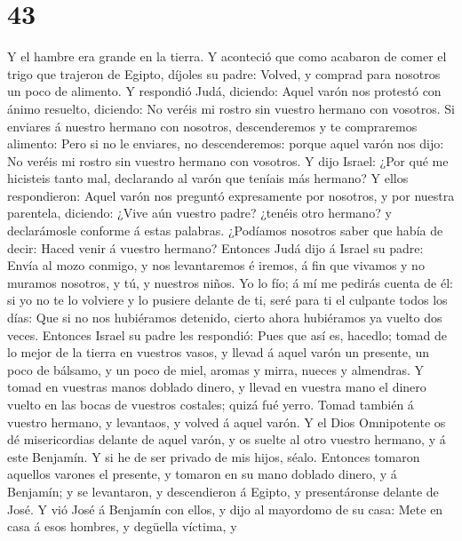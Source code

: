 \hypertarget{section-42}{%
\section{43}\label{section-42}}

 Y el hambre era grande en la tierra.  Y
aconteció que como acabaron de comer el trigo que trajeron de Egipto,
díjoles su padre: Volved, y comprad para nosotros un poco de alimento.
 Y respondió Judá, diciendo: Aquel varón nos protestó con
ánimo resuelto, diciendo: No veréis mi rostro sin vuestro hermano con
vosotros.  Si enviares á nuestro hermano con nosotros,
descenderemos y te compraremos alimento:  Pero si no le
enviares, no descenderemos: porque aquel varón nos dijo: No veréis mi
rostro sin vuestro hermano con vosotros.  Y dijo Israel:
¿Por qué me hicisteis tanto mal, declarando al varón que teníais más
hermano?  Y ellos respondieron: Aquel varón nos preguntó
expresamente por nosotros, y por nuestra parentela, diciendo: ¿Vive aún
vuestro padre? ¿tenéis otro hermano? y declarámosle conforme á estas
palabras. ¿Podíamos nosotros saber que había de decir: Haced venir á
vuestro hermano?  Entonces Judá dijo á Israel su padre:
Envía al mozo conmigo, y nos levantaremos é iremos, á fin que vivamos y
no muramos nosotros, y tú, y nuestros niños.  Yo lo fío; á
mí me pedirás cuenta de él: si yo no te lo volviere y lo pusiere delante
de ti, seré para ti el culpante todos los días:  Que si
no nos hubiéramos detenido, cierto ahora hubiéramos ya vuelto dos veces.
 Entonces Israel su padre les respondió: Pues que así es,
hacedlo; tomad de lo mejor de la tierra en vuestros vasos, y llevad á
aquel varón un presente, un poco de bálsamo, y un poco de miel, aromas y
mirra, nueces y almendras.  Y tomad en vuestras manos
doblado dinero, y llevad en vuestra mano el dinero vuelto en las bocas
de vuestros costales; quizá fué yerro.  Tomad también á
vuestro hermano, y levantaos, y volved á aquel varón.  Y
el Dios Omnipotente os dé misericordias delante de aquel varón, y os
suelte al otro vuestro hermano, y á este Benjamín. Y si he de ser
privado de mis hijos, séalo.  Entonces tomaron aquellos
varones el presente, y tomaron en su mano doblado dinero, y á Benjamín;
y se levantaron, y descendieron á Egipto, y presentáronse delante de
José.  Y vió José á Benjamín con ellos, y dijo al
mayordomo de su casa: Mete en casa á esos hombres, y degüella víctima, y
